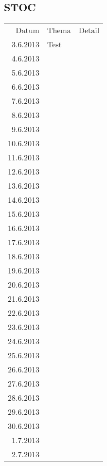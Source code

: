\subsection{STOC}
\begin{tabular}{r l p{}}
\rowcolor{lgray} Datum     & Thema         & Detail \\
\rowcolor{white}  3.6.2013 & Test          &  \\
\rowcolor{lgray}  4.6.2013 &               &  \\
\rowcolor{white}  5.6.2013 &               &  \\
\rowcolor{lgray}  6.6.2013 &               &  \\
\rowcolor{white}  7.6.2013 &               &  \\
\rowcolor{lgray}  8.6.2013 &               &  \\
\rowcolor{white}  9.6.2013 &               &  \\
\rowcolor{lgray} 10.6.2013 &               &  \\
\rowcolor{white} 11.6.2013 &               &  \\
\rowcolor{lgray} 12.6.2013 &               &  \\
\rowcolor{white} 13.6.2013 &               &  \\
\rowcolor{lgray} 14.6.2013 &               &  \\
\rowcolor{white} 15.6.2013 &               &  \\
\rowcolor{lgray} 16.6.2013 &               &  \\
\rowcolor{white} 17.6.2013 &               &  \\
\rowcolor{lgray} 18.6.2013 &               &  \\
\rowcolor{white} 19.6.2013 &               &  \\
\rowcolor{lgray} 20.6.2013 &               &  \\
\rowcolor{white} 21.6.2013 &               &  \\
\rowcolor{lgray} 22.6.2013 &               &  \\
\rowcolor{white} 23.6.2013 &               &  \\
\rowcolor{lgray} 24.6.2013 &               &  \\
\rowcolor{white} 25.6.2013 &               &  \\
\rowcolor{lgray} 26.6.2013 &               &  \\
\rowcolor{white} 27.6.2013 &               &  \\
\rowcolor{lgray} 28.6.2013 &               &  \\
\rowcolor{white} 29.6.2013 &               &  \\
\rowcolor{lgray} 30.6.2013 &               &  \\
\rowcolor{white}  1.7.2013 &               &  \\
\rowcolor{lgray}  2.7.2013 &               &  \\
\end{tabular}

